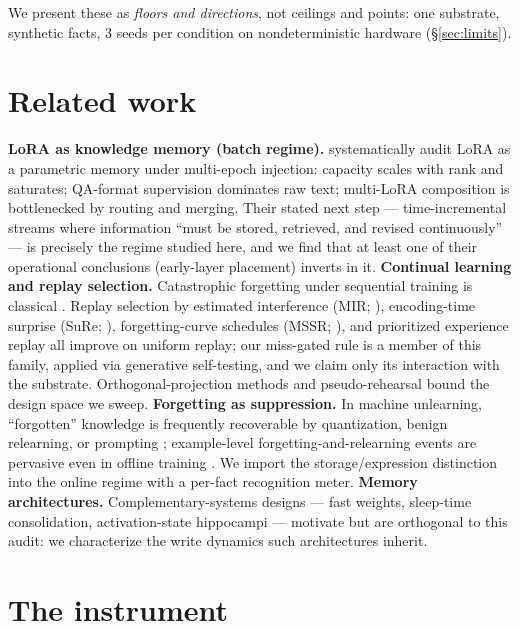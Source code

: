\documentclass[11pt]{article}
\begin{document}
We present these as \emph{floors and directions}, not ceilings and points: one substrate, synthetic
facts, 3 seeds per condition on nondeterministic hardware (\S\ref{sec:limits}).

\section{Related work}\label{sec:related}

\textbf{LoRA as knowledge memory (batch regime).} \citet{back2026lora} systematically audit LoRA as a
parametric memory under multi-epoch injection: capacity scales with rank and saturates; QA-format
supervision dominates raw text; multi-LoRA composition is bottlenecked by routing and merging. Their
stated next step --- time-incremental streams where information ``must be stored, retrieved, and revised
continuously'' --- is precisely the regime studied here, and we find that at least one of their
operational conclusions (early-layer placement) inverts in it. \textbf{Continual learning and replay
selection.} Catastrophic forgetting under sequential training is classical
\citep{mccloskey1989,kirkpatrick2017}. Replay selection by estimated interference (MIR;
\citealt{aljundi2019mir}), encoding-time surprise (SuRe; \citealt{sure2025}), forgetting-curve schedules
(MSSR; \citealt{mssr2026}), and prioritized experience replay \citep{schaul2015} all improve on uniform
replay; our miss-gated rule is a member of this family, applied via generative self-testing, and we
claim only its interaction with the substrate. Orthogonal-projection methods \citep{farajtabar2020ogd}
and pseudo-rehearsal \citep{robins1995} bound the design space we sweep. \textbf{Forgetting as
suppression.} In machine unlearning, ``forgotten'' knowledge is frequently recoverable by quantization,
benign relearning, or prompting \citep{quantization-unlearning,unlearning-deletion,kotha2023};
example-level forgetting-and-relearning events are pervasive even in offline training
\citep{toneva2019}. We import the storage/expression distinction \citep{allenzhu2024} into the online
regime with a per-fact recognition meter. \textbf{Memory architectures.} Complementary-systems designs
--- fast weights, sleep-time consolidation, activation-state hippocampi
\citep{behrouz2024titans,ahn2025} --- motivate but are orthogonal to this audit: we characterize the
write dynamics such architectures inherit.

\section{The instrument}\label{sec:instrument}
\end{document}
